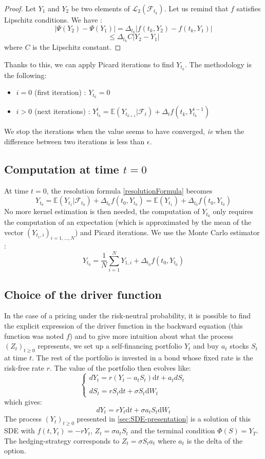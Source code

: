 \documentclass[a4paper,11pt,english]{book}
\begin{document}
\begin{proof}
Let $Y_{1}$ and $Y_{2}$ be two elements of $\mathcal{L}_{2}(\mathcal{F}_{t_{k}})$. Let us remind that $f$ satisfies Lipschitz conditions. We have : $$|\Psi(Y_{2})-\Psi(Y_{1})|=\Delta_{t_{k}}|f(t_{k},Y_{2})-f(t_{k},Y_{1})|$$
$$\leq \Delta_{t_{k}} C|Y_{2}-Y_{1}|$$
where $C$ is the Lipschitz constant.
\end{proof}
Thanks to this, we can apply Picard iterations to find $Y_{t_{k}}$. The methodology is the following:
\begin{itemize}
    \item $i=0$ (first iteration) : $Y_{t_{k}}=0$
    \item $i>0$ (next iterations) : $Y_{t_{k}}^{i}=\mathbb{E}(Y_{t_{k+1}}|\mathcal{F}_{t}) + \Delta_{t}f(t_{k},Y_{t_{k}}^{i-1})$
\end{itemize}
We stop the iterations when the value seems to have converged, \textit{ie} when the difference between two iterations is less than $\epsilon$.
\subsection{Computation at time $t=0$}
\label{subsec:computation-0}
At time $t=0$, the resolution formula \eqref{resolutionFormula} becomes $$Y_{t_{0}} = \mathbb{E}(Y_{t_{1}}|\mathcal{F}_{t_{0}}) + \Delta_{t_{0}}f(t_{0},Y_{t_{0}})=\mathbb{E}(Y_{t_{1}}) + \Delta_{t_{0}}f(t_{0},Y_{t_{0}})$$
No more kernel estimation is then needed, the computation of $Y_{t_{0}}$ only requires the computation of an expectation (which is approximated by the mean of the vector $(Y_{t_1,i})_{i=1,\ldots,N}$) and Picard iterations. We use the Monte Carlo estimator :
$$Y_{t_{0}} = \frac{1}{N}\sum_{i=1}^{N}Y_{1,i}+\Delta_{t_{0}}f(t_0,Y_{t_{0}})$$

\subsection{Choice of the driver function}
\label{subsec:choice-of-f}
In the case of a pricing under the risk-neutral probability, it is possible to find the explicit expression of the driver function in the backward equation (this function was noted $f$) and to give more intuition about what the process $(Z_{t})_{t\geq0}$ represents, we set up a self-financing portfolio $Y_{t}$ and buy $a_{t}$ stocks $S_{t}$ at time $t$. The rest of the portfolio is invested in a bond whose fixed rate is the risk-free rate $r$. The value of the portfolio then evolves like:
$$\begin{cases}
dY_{t} = r(Y_{t}-a_{t}S_{t})\text{d}t + a_{t}dS_{t}\\
 \\
dS_{t}=rS_t\text{d}t+\sigma S_t\text{d}W_{t}
\end{cases}$$
which gives:
$$dY_{t} = rY_{t}\text{d}t + \sigma a_{t}S_{t}\text{d}W_{t}$$
The process $(Y_{t})_{t\geq0}$ presented in \ref{sec:SDE-presentation} is a solution of this SDE with $f(t,Y_{t})=-rY_{t}$, $Z_{t} = \sigma a_{t}S_{t}$ and the terminal condition $\Phi(S)=Y_{T}$.
The hedging-strategy corresponds to $Z_{t}=\sigma S_{t} a_{t}$ where $a_{t}$ is the delta of the option. 
\end{document}
